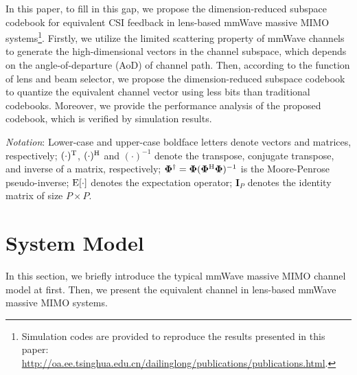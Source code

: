 \documentclass[10pt,twocolumn,twoside]{IEEEtran}
\begin{document}
In this paper, to fill in this gap, we propose the dimension-reduced subspace codebook for equivalent CSI feedback in lens-based mmWave massive MIMO systems\footnote{Simulation codes are provided to reproduce the results presented in this paper: \url{http://oa.ee.tsinghua.edu.cn/dailinglong/publications/publications.html}.}.
Firstly, we utilize the limited scattering property of mmWave channels to generate the high-dimensional vectors in the channel subspace,
which depends on the angle-of-departure (AoD) of channel path.
Then, according to the function of lens and beam selector,
we propose the dimension-reduced subspace codebook to quantize the equivalent channel vector using less bits than traditional codebooks.
Moreover, we provide the performance analysis of the proposed codebook, which is verified by simulation results.


\emph{Notation}:
Lower-case and upper-case boldface letters denote vectors and matrices, respectively;
$(\cdot)^{\rm{T}}$, $(\cdot)^{\rm{H}}$ and $(\cdot)^{-1}$ denote the transpose, conjugate transpose, and inverse of a matrix, respectively;
$\mathbf{\Phi}^{\dagger}=\mathbf{\Phi}(\mathbf{\Phi}^{\rm{H}}\mathbf{\Phi})^{-1}$ is the Moore-Penrose pseudo-inverse; $\rm{E}[\cdot]$ denotes the expectation operator;
$\mathbf{I}_P$ denotes the identity matrix of size $P\times P$.

\section{System Model}\label{S2}
In this section, we briefly introduce the typical mmWave massive MIMO channel model at first.
Then, we present the equivalent channel in lens-based mmWave massive MIMO systems.
\end{document}
